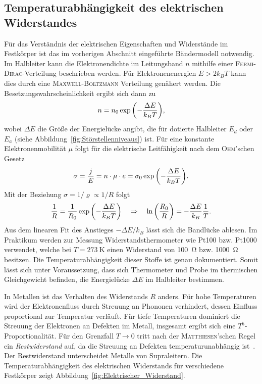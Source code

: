 \documentclass[parskip=half, a4paper,twoside,final]{article}
\begin{document}
\subsection{Temperaturabhängigkeit des elektrischen Widerstandes}\label{sec:Widerstand}
Für das Verständnis der elektrischen Eigenschaften und Widerstände im Festkörper ist das im vorherigen Abschnitt eingeführte Bändermodell notwendig. Im Halbleiter kann die Elektronendichte im Leitungsband $n$ mithilfe einer \textsc{Fermi-Dirac}-Verteilung beschrieben werden. Für Elektronenenergien $E > 2k_B T$ kann dies durch eine \textsc{Maxwell-Boltzmann} Verteilung genähert werden. Die Besetzungswahrscheinlichkeit ergibt sich dann zu~\cite{Thurk}
\begin{align}
  n = n_0 \exp\qty(-\frac{\Delta E}{k_B T}),
\end{align}
wobei $\Delta E$ die Größe der Energielücke angibt, die für dotierte Halbleiter $E_d$ oder $E_a$ (siehe Abbildung~\ref{fig:Störstellenniveaus}) ist.
Für eine konstante Elektronenmobilität $\mu$ folgt für die elektrische Leitfähigkeit nach dem \textsc{Ohm}'schen Gesetz~\cite{Thurk}
\begin{align}
  \sigma = \frac{j}{E} = n \cdot \mu \cdot e = \sigma_0 \exp\qty(-\frac{\Delta E}{k_B T}).
\end{align}
Mit der Beziehung $\sigma = 1/\varrho \propto 1/R$ folgt
\begin{align}\label{eqn:Anstieg_Bandlücke}
  \frac{1}{R} = \frac{1}{R_0} \exp\qty(-\frac{\Delta E}{k_B T}) \quad \Rightarrow \quad \ln\qty(\frac{R_0}{R}) = -\frac{\Delta E}{k_B}\frac{1}{T}.
\end{align}
Aus dem linearen Fit des Anstieges $-\Delta E/k_B$ lässt sich die Bandlücke ablesen. Im Praktikum werden zur Messung Widerstandsthermometer wie Pt100 bzw. Pt1000 verwendet, welche bei $T = \SI{273}{\kelvin}$ einen Widerstand von \SI{100}{\ohm} bzw. \SI{1000}{\ohm} besitzen. Die Temperaturabhängigkeit dieser Stoffe ist genau dokumentiert. Somit lässt sich unter Voraussetzung, dass sich Thermometer und Probe im thermischen Gleichgewicht befinden, die Energielücke $\Delta E$ im Halbleiter bestimmen.

In Metallen ist das Verhalten des Widerstands $R$ anders. Für hohe Temperaturen wird der Elektronenfluss durch Streuung an Phononen verhindert, dessen Einfluss proportional zur Temperatur verläuft. Für tiefe Temperaturen dominiert die Streuung der Elektronen an Defekten im Metall, insgesamt ergibt sich eine $T^5$-Proportionalität. Für den Grenzfall $T \to 0$ tritt nach der \textsc{Matthiesen}'schen Regel ein \emph{Restwiderstand} auf, da die Streuung an Defekten temperaturunabhängig ist~\cite{Hunklinger}. Der Restwiderstand unterscheidet Metalle von Supraleitern. Die Temperaturabhängigkeit des elektrischen Widerstands für verschiedene Festkörper zeigt Abbildung~\ref{fig:Elektrischer_Widerstand}.
\end{document}
